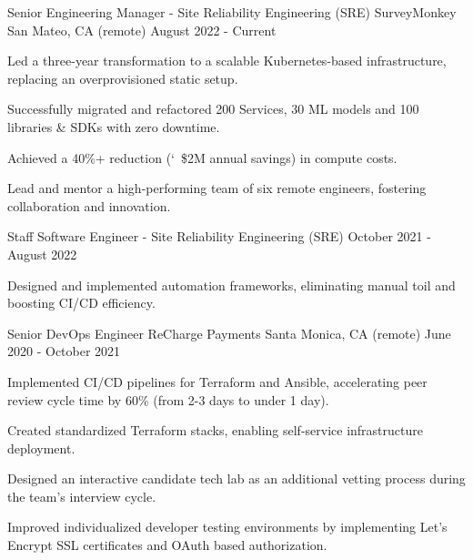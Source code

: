 

\begin{cventries}

  \cventry
    {Senior Engineering Manager - Site Reliability Engineering (SRE)} %
    {SurveyMonkey} %
    {San Mateo, CA  (remote)} %
    {August 2022 - Current} %
    {
      \begin{cvitems} %
        \item {Led a three-year transformation to a scalable Kubernetes-based infrastructure, replacing an overprovisioned static setup.}
        \item {Successfully migrated and refactored 200 Services, 30 ML models and 100 libraries \& SDKs with zero downtime.}
        \item {Achieved a 40\%+ reduction (\char`~\$2M annual savings) in compute costs.}
        \item {Lead and mentor a high-performing team of six remote engineers, fostering collaboration and innovation.}
      \end{cvitems}
    }

  \cventry
    {Staff Software Engineer - Site Reliability Engineering (SRE)} %
    {} %
    {} %
    {October 2021 - August 2022} %
    {
      \begin{cvitems}
        \item {Designed and implemented automation frameworks, eliminating manual toil and boosting CI/CD efficiency.}
      \end{cvitems}
    }

  \cventry
  {Senior DevOps Engineer} %
  {ReCharge Payments} %
  {Santa Monica, CA (remote)} %
  {June 2020 - October 2021} %
  { 
    \begin{cvitems} %
      \item {Implemented CI/CD pipelines for Terraform and Ansible, accelerating peer review cycle time by 60\% (from 2-3 days to under 1 day).}
      \item {Created standardized Terraform stacks, enabling self-service infrastructure deployment.}
      \item {Designed an interactive candidate tech lab as an additional vetting process during the team's interview cycle.}
      \item {Improved individualized developer testing environments by implementing Let's Encrypt SSL certificates and OAuth based authorization.}
    \end{cvitems}
  }


\end{cventries}
